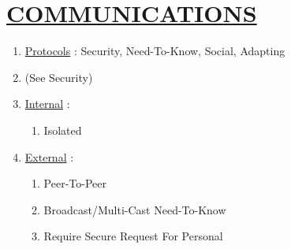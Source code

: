 \documentclass[11pt]{article}
\begin{document}
\section*{\ul{COMMUNICATIONS}}
\begin{enumerate}
	\item[] \ul{Protocols} : Security, Need-To-Know, Social, Adapting
	
	\item[] (See Security)
	
	\item[] \ul{Internal} :
	\begin{enumerate}
		\item[] Isolated
	\end{enumerate}

	\item[] \ul{External} :
	\begin{enumerate}
		\item[] Peer-To-Peer
		\item[] Broadcast/Multi-Cast Need-To-Know
		\item[] Require Secure Request For Personal
	\end{enumerate}

\end{enumerate}
\end{document}
